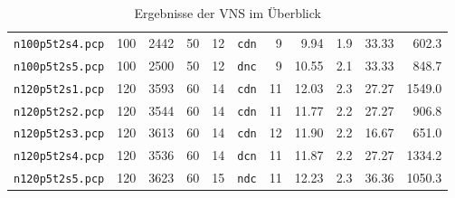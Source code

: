 \begin{table}[!htbp]
\begin{tabular}{c|rrr|r|c|rrr|r|r}
\texttt{n100p5t2s4.pcp} & 100	& 2442	& 50	& 12 & \texttt{cdn} & 9 & 9.94 & 1.9 & 33.33 & 602.3\\
\texttt{n100p5t2s5.pcp} & 100	& 2500	& 50	& 12 & \texttt{dnc} & 9 & 10.55 & 2.1 & 33.33 & 848.7\\
\texttt{n120p5t2s1.pcp} & 120	& 3593	& 60	& 14 & \texttt{cdn} & 11 & 12.03 & 2.3 & 27.27 & 1549.0\\
\texttt{n120p5t2s2.pcp} & 120	& 3544	& 60	& 14 & \texttt{cdn} & 11 & 11.77 & 2.2 & 27.27 & 906.8\\
\texttt{n120p5t2s3.pcp} & 120	& 3613	& 60	& 14 & \texttt{cdn} & 12 & 11.90 & 2.2 & 16.67 & 651.0\\
\texttt{n120p5t2s4.pcp} & 120	& 3536	& 60	& 14 & \texttt{dcn} & 11 & 11.87 & 2.2 & 27.27 & 1334.2\\
\texttt{n120p5t2s5.pcp} & 120	& 3623	& 60	& 15 & \texttt{ndc} & 11 & 12.23 & 2.3 & 36.36 & 1050.3\\
\end{tabular}
\caption{Ergebnisse der VNS im Überblick}
\label{tab:result}
\end{table}
